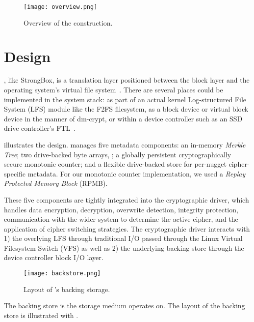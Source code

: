 \begin{figure}[t]
 \centering
  \texttt{[image: overview.png]}
   \caption{Overview of the \SYSTEM{} construction.}\label{fig:overview}
\end{figure}

\section{\SYSTEM{} Design}\label{sec:design}


\SYSTEM{}, like StrongBox, is a translation layer positioned between the block
layer and the operating system's virtual file system~\cite{StrongBox}. There are
several places \SYSTEM{} could be implemented in the system stack: as part of an
actual kernel Log-structured File System (LFS) module like the F2FS filesystem,
as a block device or virtual block device in the manner of dm-crypt, or within a
device controller such as an SSD drive controller's FTL~\cite{StrongBox}.

 illustrates the \SYSTEM{} design. \SYSTEM{} manages five
metadata components: an in-memory \emph{Merkle Tree}; two drive-backed byte
arrays, ; a
globally persistent cryptographically secure monotonic counter; and a flexible
drive-backed store for per-nugget cipher-specific metadata. For our
monotonic counter implementation, we used a \emph{Replay Protected Memory Block}
(RPMB).

These five components are tightly integrated into the cryptographic driver,
which handles data encryption, decryption, overwrite detection, integrity
protection, communication with the wider system to determine the active cipher,
and the application of cipher switching strategies. The cryptographic driver
interacts with 1) the overlying LFS through traditional I/O passed through the
Linux Virtual Filesystem Switch (VFS) as well as 2) the underlying backing store
through the device controller block I/O layer.

\begin{figure}[t]
 \centering
  \texttt{[image: backstore.png]}
   \caption{Layout of \SYSTEM{}'s backing storage.}\label{fig:backstore}
\end{figure}

The backing store is the storage medium \SYSTEM{} operates on. The layout of the
backing store is illustrated with . 

